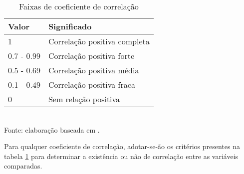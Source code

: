 \begin{table}[H]
	\centering
	\label{tab:faixas-coeficiente-correlacao}
	\caption{Faixas de coeficiente de correlação}
	\begin{tabular}{@{}lp{6cm}@{}}
		\toprule
		\textbf{Valor} & \textbf{Significado} \\ \midrule
		1          & Correlação positiva completa \\ \midrule
		0.7 - 0.99 & Correlação positiva forte    \\ \midrule
		0.5 - 0.69 & Correlação positiva média    \\ \midrule
		0.1 - 0.49 & Correlação positiva fraca    \\ \midrule
		0          & Sem relação positiva         \\ \bottomrule
	\end{tabular}
	\\ \footnotesize{Fonte: elaboração baseada em \cite{ali2022spearman}.}
\end{table}

Para qualquer coeficiente de correlação, adotar-se-ão os critérios presentes na tabela \ref{tab:faixas-coeficiente-correlacao} para determinar a existência ou não de correlação entre as variáveis comparadas.